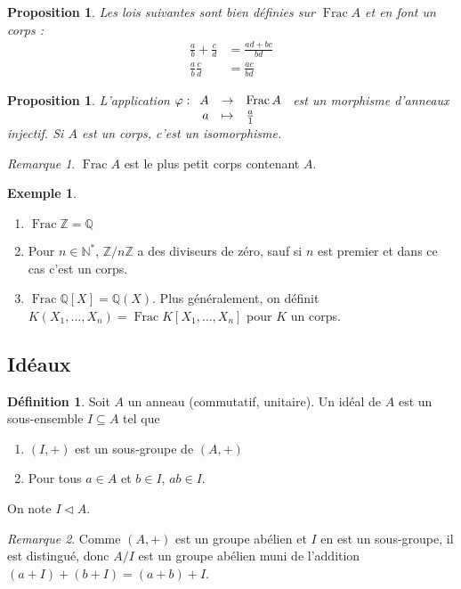 \documentclass{article}
\newcommand{\N}{\mathbb{N}}
\newcommand{\Z}{\mathbb{Z}}
\newcommand{\Q}{\mathbb{Q}}
\DeclareMathOperator{\Frac}{Frac}
\newcommand{\applic}[4]{\begin{array}[t]{rcl}
#1 & \to & #2 \\
#3 & \mapsto & #4
\end{array}}
\theoremstyle{plain}
\newtheorem{proposition}[theorem]{Proposition}
\theoremstyle{definition}
\newtheorem{definition}[theorem]{Définition}
\newtheorem{example}[theorem]{Exemple}
\theoremstyle{remark}
\newtheorem*{remark}{Remarque}
\begin{document}
\begin{proposition}
    Les lois suivantes sont bien définies sur $\Frac A$ et en font un corps :
    \begin{align*}
        \frac{a}{b} + \frac{c}{d} & = \frac{ad+bc}{bd} \\
        \frac{a}{b} \frac{c}{d} & = \frac{ac}{bd}
    \end{align*}
\end{proposition}

\begin{proposition}
    L'application $\varphi : \applic{A}{\Frac A}{a}{\frac{a}{1}}$ est un morphisme d'anneaux injectif. Si $A$ est un corps, c'est un isomorphisme.
\end{proposition}

\begin{remark}
    $\Frac A$ est le plus petit corps contenant $A$.
\end{remark}

\begin{example} \leavevmode
    \begin{enumerate}
        \item $\Frac \Z = \Q$
        \item Pour $n\in \N^*$, $\Z/n\Z$ a des diviseurs de zéro, sauf si $n$ est premier et dans ce cas c'est un corps.
        \item $\Frac \Q[X] = \Q(X)$. Plus généralement, on définit $K(X_1,\dots,X_n) = \Frac K[X_1,\dots,X_n]$ pour $K$ un corps.
    \end{enumerate}
\end{example}

\subsection{Idéaux}

\begin{definition}
    Soit $A$ un anneau (commutatif, unitaire). Un idéal de $A$ est un sous-ensemble $I \subseteq A$ tel que
    \begin{enumerate}
        \item $(I,+)$ est un sous-groupe de $(A,+)$
        \item Pour tous $a \in A$ et $b \in I$, $ab \in I$.
    \end{enumerate}
    On note $I \lhd A$.
\end{definition}

\begin{remark}
    Comme $(A,+)$ est un groupe abélien et $I$ en est un sous-groupe, il est distingué, donc $A/I$ est un groupe abélien muni de l'addition $(a+I) + (b+I) = (a+b) + I$.
\end{remark}
\end{document}
